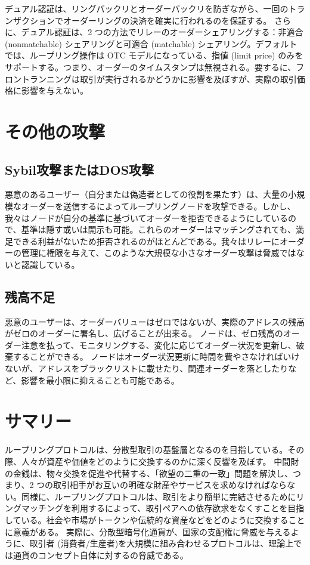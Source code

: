 \documentclass{article}
\begin{document}
\begin{multicols}{2}
デュアル認証は、リングパックリとオーダーパックリを防ぎながら、一回のトランザクションでオーダーリングの決済を確実に行われるのを保証する。 さらに、デュアル認証は、2 つの方法でリレーのオーダーシェアリングする：非適合 (nonmatchable) シェアリングと可適合 (matchable) シェアリング。デフォルトでは、ループリング操作は OTC モデルになっている、指値 (limit price) のみをサポートする。つまり、オーダーのタイムスタンプは無視される。要するに、フロントランニングは取引が実行されるかどうかに影響を及ぼすが、実際の取引価格に影響を与えない。

\section{その他の攻撃}
\subsection{Sybil攻撃またはDOS攻撃}

悪意のあるユーザー（自分または偽造者としての役割を果たす）は、大量の小規模なオーダーを送信するによってループリングノードを攻撃できる。しかし、我々はノードが自分の基準に基づいてオーダーを拒否できるようにしているので、基準は隠す或いは開示も可能。これらのオーダーはマッチングされても、満足できる利益がないため拒否されるのがほとんどである。我々はリレーにオーダーの管理に権限を与えて、このような大規模な小さなオーダー攻撃は脅威ではないと認識している。
\subsection{残高不足}
悪意のユーザーは、オーダーバリューはゼロではないが、実際のアドレスの残高がゼロのオーダーに署名し、広げることが出来る。 ノードは、ゼロ残高のオーダー注意を払って、モニタリングする、変化に応じてオーダー状況を更新し、破棄することができる。 ノードはオーダー状況更新に時間を費やさなければいけないが、アドレスをブラックリストに載せたり、関連オーダーを落としたりなど、影響を最小限に抑えることも可能である。

\section{サマリー}
ループリングプロトコルは、分散型取引の基盤層となるのを目指している。その際、人々が資産や価値をどのように交換するのかに深く反響を及ぼす。 中間財の金銭は、物々交換を促進や代替する、「欲望の二重の一致」問題\cite{unenumerated2006}を解決し、つまり、2 つの取引相手がお互いの明確な財産やサービスを求めなければならない。同様に、ループリングプロトコルは、取引をより簡単に完結させるためにリングマッチングを利用するによって、取引ペアへの依存欲求をなくすことを目指している。社会や市場がトークンや伝統的な資産などをどのように交換することに意義がある。 
実際に、分散型暗号化通貨が、国家の支配権に脅威を与えるように、取引者 (消費者/生産者)を大規模に組み合わせるプロトコルは、理論上では通貨のコンセプト自体に対するの脅威である。


\end{multicols}
\end{document}
